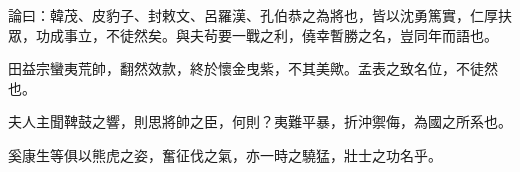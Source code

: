 \begin{pinyinscope}
 論曰：韓茂、皮豹子、封敕文、呂羅漢、孔伯恭之為將也，皆以沈勇篤實，仁厚扶眾，功成事立，不徒然矣。與夫茍要一戰之利，僥幸暫勝之名，豈同年而語也。



 田益宗蠻夷荒帥，翻然效款，終於懷金曳紫，不其美歟。孟表之致名位，不徒然也。



 夫人主聞鞞鼓之響，則思將帥之臣，何則？夷難平暴，折沖禦侮，為國之所系也。



 奚康生等俱以熊虎之姿，奮征伐之氣，亦一時之驍猛，壯士之功名乎。



\end{pinyinscope}